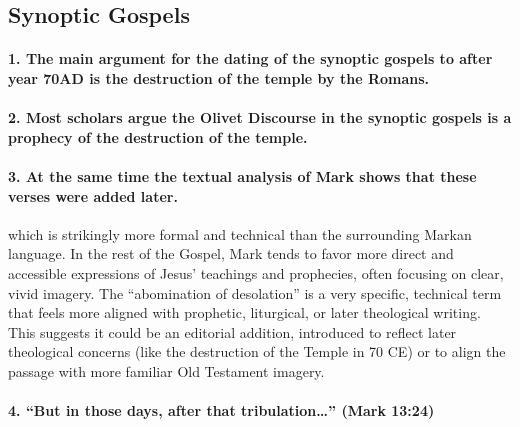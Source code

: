 \subsection{Synoptic Gospels}\label{par:synoptic-gospels}

\paragraph{1.
The main argument for the dating of the synoptic gospels to after year 70AD is the destruction of the temple by the Romans.}\label{par:the-main-argument-for-the-dating-of-the-synoptic-gospels-to-after-year-70ad-is-the-destruction-of-the-temple-by-the-romans.}

\paragraph{2.
Most scholars argue the Olivet Discourse in the synoptic gospels is a prophecy of the destruction of the temple.}\label{par:most-scholars-argue-the-olivet-discourse-in-the-synoptic-gospels-is-a-prophecy-of-the-destruction-of-the-temple.}

\paragraph{3.
At the same time the textual analysis of Mark shows that these verses were added later.}\label{par:at-the-same-time-the-textual-analysis-of-mark-shows-that-these-verses-were-added-later.}

which is strikingly more formal and technical than the surrounding Markan language.
In the rest of the Gospel, Mark tends to favor more direct and accessible expressions of Jesus' teachings and prophecies, often focusing on clear, vivid imagery.
The ``abomination of desolation'' is a very specific, technical term that feels more aligned with prophetic, liturgical, or later theological writing.
This suggests it could be an editorial addition, introduced to reflect later theological concerns (like the destruction of the Temple in 70 CE) or to align the passage with more familiar Old Testament imagery.

\paragraph{\texorpdfstring{4.
``But in those days, after that tribulation\ldots{}'' (Mark 13:24)}{4.
``But in those days, after that tribulation\ldots'' (Mark 13:24)}}\label{par:but-in-those-days-after-that-tribulation-mark-1324}

